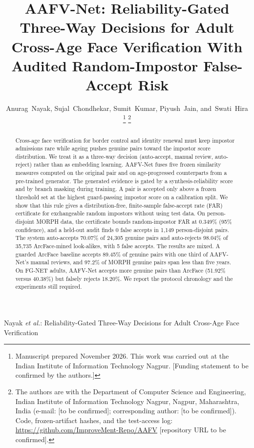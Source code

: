 \documentclass[journal]{IEEEtran}
\begin{document}
\title{AAFV-Net: Reliability-Gated Three-Way Decisions for Adult Cross-Age Face Verification With Audited Random-Impostor False-Accept Risk}

\author{Anurag~Nayak,
        Sujal~Chondhekar,
        Sumit~Kumar,
        Piyush~Jain,
        and~Swati~Hira%
\thanks{Manuscript prepared November 2026. This work was carried out at the Indian Institute of Information Technology Nagpur. [Funding statement to be confirmed by the authors.]}%
\thanks{The authors are with the Department of Computer Science and Engineering, Indian Institute of Information Technology Nagpur, Nagpur, Maharashtra, India (e-mail: [to be confirmed]; corresponding author: [to be confirmed]). Code, frozen-artifact hashes, and the test-access log: \url{https://github.com/ImproveMent-Repo/AAFV} [repository URL to be confirmed].}}

%
{Nayak \MakeLowercase{\textit{et al.}}: Reliability-Gated Three-Way Decisions for Adult Cross-Age Face Verification}

\maketitle

\begin{abstract}
Cross-age face verification for border control and identity renewal must keep impostor admissions rare while ageing pushes genuine pairs toward the impostor score distribution. We treat it as a three-way decision (auto-accept, manual review, auto-reject) rather than as embedding learning. AAFV-Net fuses five frozen similarity measures computed on the original pair and on age-progressed counterparts from a pre-trained generator. The generated evidence is gated by a synthesis-reliability score and by branch masking during training. A pair is accepted only above a frozen threshold set at the highest guard-passing impostor score on a calibration split. We show that this rule gives a distribution-free, finite-sample false-accept rate (FAR) certificate for exchangeable random impostors without using test data. On person-disjoint MORPH data, the certificate bounds random-impostor FAR at 0.349\% (95\% confidence), and a held-out audit finds 0 false accepts in 1,149 person-disjoint pairs. The system auto-accepts 70.07\% of 24,305 genuine pairs and auto-rejects 98.04\% of 35,735 ArcFace-mined look-alikes, with 5 false accepts. The results are mixed. A guarded ArcFace baseline accepts 89.45\% of genuine pairs with one third of AAFV-Net's manual reviews, and 97.2\% of MORPH genuine pairs span less than five years. On FG-NET adults, AAFV-Net accepts more genuine pairs than ArcFace (51.92\% versus 40.38\%) but falsely rejects 18.20\%. We report the protocol chronology and the experiments still required.
\end{abstract}
\end{document}
